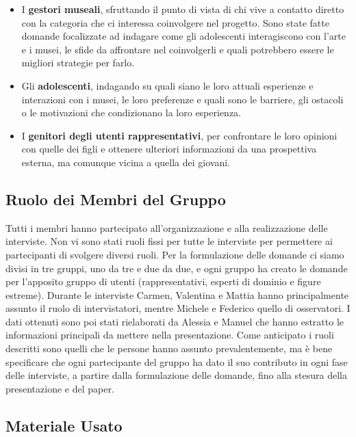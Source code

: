 \documentclass{article}
\begin{document}
\begin{itemize}
    \item I \textbf{gestori museali}, sfruttando il punto di vista di chi vive a contatto diretto con la categoria che ci interessa coinvolgere nel progetto. Sono state fatte domande focalizzate ad indagare come gli adolescenti interagiscono con l'arte e i musei, le sfide da affrontare nel coinvolgerli e quali potrebbero essere le migliori strategie per farlo.
    \item Gli \textbf{adolescenti}, indagando su quali siano le loro attuali esperienze e interazioni con i musei, le loro preferenze e quali sono le barriere, gli ostacoli o le motivazioni che condizionano la loro esperienza.
    \item I \textbf{genitori degli utenti rappresentativi}, per confrontare le loro opinioni con quelle dei figli e ottenere ulteriori informazioni da una prospettiva esterna, ma comunque vicina a quella dei giovani.
\end{itemize}

\subsection{Ruolo dei Membri del Gruppo}

Tutti i membri hanno partecipato all'organizzazione e alla realizzazione delle interviste. Non vi sono stati ruoli fissi per tutte le interviste per permettere ai partecipanti di svolgere diversi ruoli.
Per la formulazione delle domande ci siamo divisi in tre gruppi, uno da tre e due da due, e ogni gruppo ha creato le domande per l'apposito gruppo di utenti (rappresentativi, esperti di dominio e figure estreme).
Durante le interviste Carmen, Valentina e Mattia hanno principalmente assunto il ruolo di intervistatori, mentre Michele e Federico quello di osservatori.
I dati ottenuti sono poi stati rielaborati da Alessia e Manuel che hanno estratto le informazioni principali da mettere nella presentazione.
Come anticipato i ruoli descritti sono quelli che le persone hanno assunto prevalentemente, ma è bene specificare che ogni partecipante del gruppo ha dato il suo contributo in ogni fase delle interviste, a partire dalla formulazione delle domande, fino alla stesura della presentazione e del paper.

\subsection{Materiale Usato}
\end{document}
